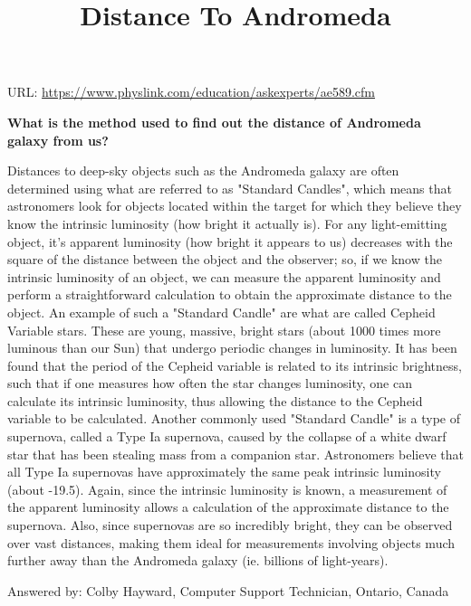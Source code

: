 \documentclass{../template/texnote}
\title{Distance To Andromeda}
\begin{document}
    \maketitle {}

URL: \url{https://www.physlink.com/education/askexperts/ae589.cfm}
\vspace{2 \baselineskip}

\textbf{What is the method used to find out the distance of Andromeda galaxy from us?}
\vspace{2 \baselineskip}

Distances to deep-sky objects such as the Andromeda galaxy are often determined using what are referred to as "Standard Candles", which means that astronomers look for objects located within the target for which they believe they know the intrinsic luminosity (how bright it actually is). For any light-emitting object, it's apparent luminosity (how bright it appears to us) decreases with the square of the distance between the object and the observer; so, if we know the intrinsic luminosity of an object, we can measure the apparent luminosity and perform a straightforward calculation to obtain the approximate distance to the object. An example of such a "Standard Candle" are what are called Cepheid Variable stars. These are young, massive, bright stars (about 1000 times more luminous than our Sun) that undergo periodic changes in luminosity. It has been found that the period of the Cepheid variable is related to its intrinsic brightness, such that if one measures how often the star changes luminosity, one can calculate its intrinsic luminosity, thus allowing the distance to the Cepheid variable to be calculated. Another commonly used "Standard Candle" is a type of supernova, called a Type Ia supernova, caused by the collapse of a white dwarf star that has been stealing mass from a companion star. Astronomers believe that all Type Ia supernovas have approximately the same peak intrinsic luminosity (about -19.5). Again, since the intrinsic luminosity is known, a measurement of the apparent luminosity allows a calculation of the approximate distance to the supernova. Also, since supernovas are so incredibly bright, they can be observed over vast distances, making them ideal for measurements involving objects much further away than the Andromeda galaxy (ie. billions of light-years).

Answered by: Colby Hayward, Computer Support Technician, Ontario, Canada
\end{document}

